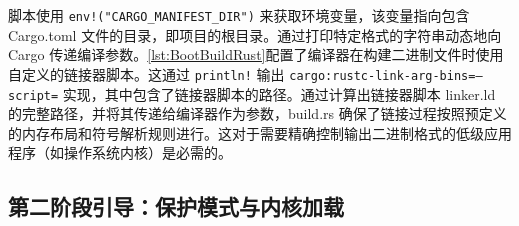 脚本使用 \texttt{env!("CARGO\_MANIFEST\_DIR")} 来获取环境变量，该变量指向包含 Cargo.toml 文件的目录，即项目的根目录。通过打印特定格式的字符串动态地向 Cargo 传递编译参数。\cref{lst:BootBuildRust}配置了编译器在构建二进制文件时使用自定义的链接器脚本。这通过 \texttt{println!} 输出 \texttt{cargo:rustc-link-arg-bins=--script={}} 实现，其中包含了链接器脚本的路径。通过计算出链接器脚本 linker.ld 的完整路径，并将其传递给编译器作为参数，build.rs 确保了链接过程按照预定义的内存布局和符号解析规则进行。这对于需要精确控制输出二进制格式的低级应用程序（如操作系统内核）是必需的。

\subsection{第二阶段引导：保护模式与内核加载}